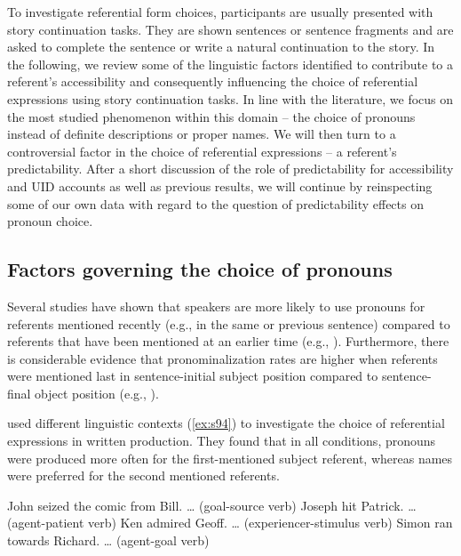 \documentclass[output=paper,colorlinks,citecolor=brown]{langscibook}
\begin{document}
To investigate referential form choices, participants are usually presented with story continuation tasks. They are shown sentences or sentence fragments and are asked to complete the sentence or write a natural continuation to the story. In the following, we review some of the linguistic factors identified to contribute to a referent's accessibility and consequently influencing the choice of referential expressions using story continuation tasks. In line with the literature, we focus on the most studied phenomenon within this domain -- the choice of pronouns instead of definite descriptions or proper names. We will then turn to a controversial factor in the choice of referential expressions -- a referent's predictability. After a short discussion of the role of predictability for accessibility and UID accounts as well as previous results, we will continue by reinspecting some of our own data with regard to the question of predictability effects on pronoun choice.

\subsection{Factors governing the choice of pronouns}

Several studies have shown that speakers are more likely to use pronouns for referents mentioned recently (e.g., in the same or previous sentence) compared to referents that have been mentioned at an earlier time (e.g., \citealt{Givon-83, Ariel-90-book, Arnold-98-thesis}). Furthermore, there is considerable evidence that pronominalization rates are higher when referents were mentioned last in sentence-initial subject position compared to sentence-final object position (e.g., \citealt{Stevenson::al-94, Arnold-01, Fukumura::van_Gompel-10}). 

\citet{Stevenson::al-94} used different linguistic contexts (\ref{ex:s94}) to investigate the choice of referential expressions in written production. They found that in all conditions, pronouns were produced more often for the first-mentioned subject referent, whereas names were preferred for the second mentioned referents.

\ea \label{ex:s94} 
    \ea John seized the comic from Bill. \ldots \label{ex:s94-a} \hfill{(goal-source verb)}
    \ex Joseph hit Patrick. \ldots  \label{ex:s94-b} \hfill{(agent-patient verb)}
    \ex Ken admired Geoff. \ldots  \label{ex:s94-c} \hfill{(experiencer-stimulus verb)}
    \ex Simon ran towards Richard. \ldots  \label{ex:s94-d} \hfill{(agent-goal verb)}
\z\z
\end{document}
